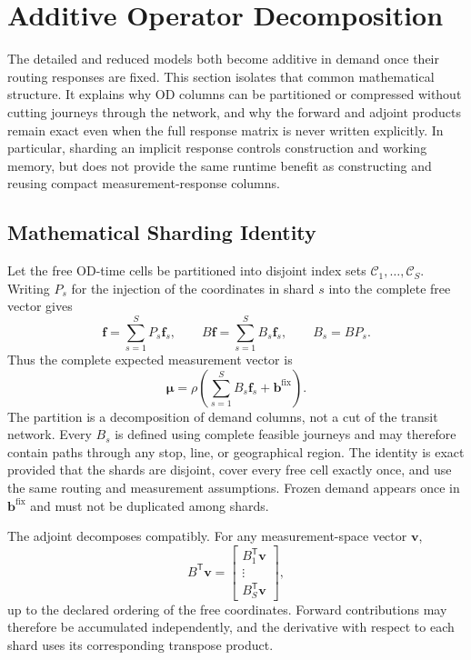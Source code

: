 
\section{Additive Operator Decomposition}

The detailed and reduced models both become additive in demand once their
routing responses are fixed. This section isolates that common mathematical
structure. It explains why OD columns can be partitioned or compressed without
cutting journeys through the network, and why the forward and adjoint products
remain exact even when the full response matrix is never written explicitly.
In particular, sharding an implicit response controls construction and working
memory, but does not provide the same runtime benefit as constructing and
reusing compact measurement-response columns.

\subsection{Mathematical Sharding Identity}
\label{sec:mathematical-sharding}

Let the free OD-time cells be partitioned into disjoint index sets
$\mathcal C_1,\ldots,\mathcal C_S$.  Writing $P_s$ for the injection of the
coordinates in shard $s$ into the complete free vector gives
\[
  \bm f=\sum_{s=1}^{S}P_s\bm f_s,
  \qquad
  B\bm f=\sum_{s=1}^{S}B_s\bm f_s,
  \qquad B_s=BP_s.
\]
Thus the complete expected measurement vector is
\begin{equation}
  \bm\mu
  =\rho\left(\sum_{s=1}^{S}B_s\bm f_s
              +\bm b^{\mathrm{fix}}\right).
  \label{eq:additive-shard-forward}
\end{equation}
The partition is a decomposition of demand columns, not a cut of the transit
network.  Every $B_s$ is defined using complete feasible journeys and may
therefore contain paths through any stop, line, or geographical region.  The
identity is exact provided that the shards are disjoint, cover every free cell
exactly once, and use the same routing and measurement assumptions.  Frozen
demand appears once in $\bm b^{\mathrm{fix}}$ and must not be duplicated among
shards.

The adjoint decomposes compatibly.  For any measurement-space vector $\bm v$,
\[
  B^{\mathsf T}\bm v
  =\begin{bmatrix}
      B_1^{\mathsf T}\bm v\\[-1mm]
      \vdots\\[-1mm]
      B_S^{\mathsf T}\bm v
    \end{bmatrix},
\]
up to the declared ordering of the free coordinates.  Forward contributions
may therefore be accumulated independently, and the derivative with respect
to each shard uses its corresponding transpose product.


